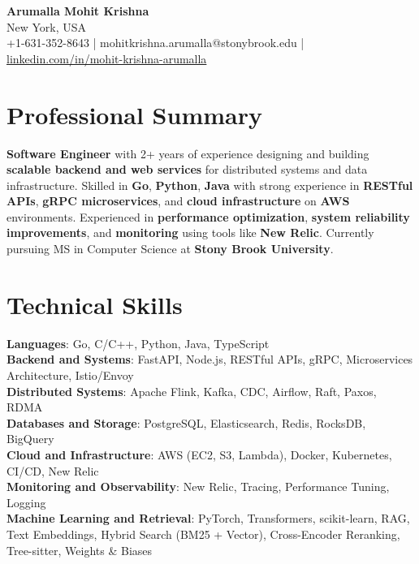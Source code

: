 \documentclass[letterpaper,11pt]{article}
\begin{document}
\begin{center}
  {\Large \textbf{Arumalla Mohit Krishna}} \\
  New York, USA \\
  +1-631-352-8643 \enspace | \enspace mohitkrishna.arumalla@stonybrook.edu \enspace | \enspace \href{https://www.linkedin.com/in/mohit-krishna-arumalla}{linkedin.com/in/mohit-krishna-arumalla}
\end{center}

\section{Professional Summary}
  \begin{itemize}[leftmargin=0.15in, label={}]
    \small{\item{
     \textbf{Software Engineer} with 2+ years of experience designing and building \textbf{scalable backend and web services} for distributed systems and data infrastructure. Skilled in \textbf{Go}, \textbf{Python}, \textbf{Java} with strong experience in \textbf{RESTful APIs}, \textbf{gRPC microservices}, and \textbf{cloud infrastructure} on \textbf{AWS} environments. Experienced in \textbf{performance optimization}, \textbf{system reliability improvements}, and \textbf{monitoring} using tools like \textbf{New Relic}. Currently pursuing MS in Computer Science at \textbf{Stony Brook University}.
    }}
  \end{itemize}
\vspace{-16pt}

\section{Technical Skills}
 \begin{itemize}[leftmargin=0.15in, label={}]
    \small{\item{
     \textbf{Languages}: Go, C/C++, Python, Java, TypeScript \\
     \textbf{Backend and Systems}: FastAPI, Node.js, RESTful APIs, gRPC, Microservices Architecture, Istio/Envoy \\
     \textbf{Distributed Systems}: Apache Flink, Kafka, CDC, Airflow, Raft, Paxos, RDMA \\
     \textbf{Databases and Storage}: PostgreSQL, Elasticsearch, Redis, RocksDB, BigQuery \\
     \textbf{Cloud and Infrastructure}: AWS (EC2, S3, Lambda), Docker, Kubernetes, CI/CD, New Relic \\
     \textbf{Monitoring and Observability}: New Relic, Tracing, Performance Tuning, Logging \\
     \textbf{Machine Learning and Retrieval}: PyTorch, Transformers, scikit-learn, RAG, Text Embeddings, Hybrid Search (BM25 + Vector), Cross-Encoder Reranking, Tree-sitter, Weights \& Biases
    }}
 \end{itemize}
\vspace{-16pt}
\end{document}
